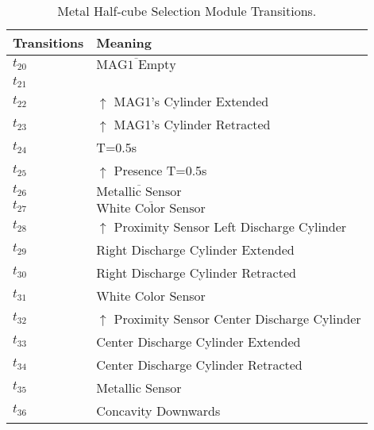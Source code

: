 \begin{table}[H]
\caption{Metal Half-cube Selection Module Transitions.}
\centering
\begin{tabular}{M{5cm}M{10cm}}
Transitions & Meaning\\
\hline
\hyperlink{partialNet:t20}{\hypertarget{partialTable:t20}{$t_{20}$}} & \(\overline{\mbox{MAG1 Empty}}\)\\
\hyperlink{partialNet:t21}{\hypertarget{partialTable:t21}{$t_{21}$}} & \\
\hyperlink{partialNet:t22}{\hypertarget{partialTable:t22}{$t_{22}$}} & \(\uparrow\) MAG1's Cylinder Extended\\
\hyperlink{partialNet:t23}{\hypertarget{partialTable:t23}{$t_{23}$}} & \(\uparrow\) MAG1's Cylinder Retracted\\
\hyperlink{partialNet:tt24}{\hypertarget{partialTable:tt24}{$t_{24}$}} & T=0.5s\\
\hyperlink{partialNet:tt25}{\hypertarget{partialTable:tt25}{$t_{25}$}} & \(\uparrow\) Presence  T=0.5s\\
\hyperlink{partialNet:t26}{\hypertarget{partialTable:t26}{$t_{26}$}} & \(\overline{\mbox{Metallic Sensor}}\)\\
\hyperlink{partialNet:t27}{\hypertarget{partialTable:t27}{$t_{27}$}} & \(\overline{\mbox{White Color Sensor}}\)\\
\hyperlink{partialNet:t28}{\hypertarget{partialTable:t28}{$t_{28}$}} & \(\uparrow\) Proximity Sensor Left Discharge Cylinder\\
\hyperlink{partialNet:t29}{\hypertarget{partialTable:t29}{$t_{29}$}} & Right Discharge Cylinder Extended\\
\hyperlink{partialNet:t30}{\hypertarget{partialTable:t30}{$t_{30}$}} & Right Discharge Cylinder Retracted\\
\hyperlink{partialNet:t31}{\hypertarget{partialTable:t31}{$t_{31}$}} & White Color Sensor\\
\hyperlink{partialNet:t32}{\hypertarget{partialTable:t32}{$t_{32}$}} & \(\uparrow\) Proximity Sensor Center Discharge Cylinder\\
\hyperlink{partialNet:t33}{\hypertarget{partialTable:t33}{$t_{33}$}} & Center Discharge Cylinder Extended\\
\hyperlink{partialNet:t34}{\hypertarget{partialTable:t34}{$t_{34}$}} & Center Discharge Cylinder Retracted\\
\hyperlink{partialNet:t35}{\hypertarget{partialTable:t35}{$t_{35}$}} & Metallic Sensor\\
\hyperlink{partialNet:t36}{\hypertarget{partialTable:t36}{$t_{36}$}} & Concavity Downwards\\

\end{tabular}
\end{table}
